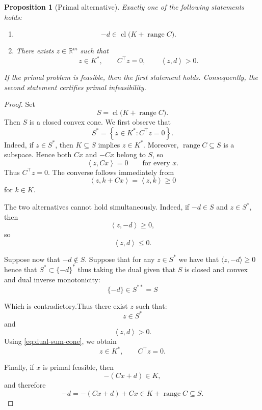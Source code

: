 \documentclass[a4paper,11pt]{book}
\theoremstyle{plain}
\newtheorem{proposition}[theorem]{Proposition}
\theoremstyle{definition}
\theoremstyle{remark}
\numberwithin{equation}{chapter}
\numberwithin{algorithm}{chapter}
\newcommand{\R}{\mathbb{R}}
\newcommand{\inner}[2]{\left\langle #1, #2 \right\rangle}
\newcommand{\range}{\operatorname{range}}
\begin{document}
	\begin{proposition}[Primal alternative]
		Exactly one of the following statements holds:
		
		\begin{enumerate}
			\item
			\[
			-d\in\operatorname{cl}\bigl(K+\range C\bigr).
			\]
			
			\item There exists \(z\in\R^m\) such that
			\[
			z\in K^*,
			\qquad
			C^\top z=0,
			\qquad
			\inner{z}{d}>0.
			\]
		\end{enumerate}
		
		If the primal problem is feasible, then the first statement holds.
		Consequently, the second statement certifies primal infeasibility.
	\end{proposition}
	
	\begin{proof}
		Set
		\[
		S=\operatorname{cl}\bigl(K+\range C\bigr).
		\]
		Then \(S\) is a closed convex cone. We first observe that
		\begin{equation}
			S^*
			=
			\left\{
			z\in K^*:C^\top z=0
			\right\}.
			\label{eq:dual-sum-cone}
		\end{equation}
		Indeed, if \(z\in S^*\), then \(K\subseteq S\) implies \(z\in K^*\).
		Moreover, \(\range C\subseteq S\) is a subspace. Hence both \(Cx\) and
		\(-Cx\) belong to \(S\), so
		\[
		\inner{z}{Cx}=0
		\qquad
		\text{for every }x.
		\]
		Thus \(C^\top z=0\). The converse follows immediately from
		\[
		\inner{z}{k+Cx}
		=
		\inner{z}{k}
		\geq0
		\]
		for \(k\in K\).
		
		The two alternatives cannot hold simultaneously. Indeed, if
		\(-d\in S\) and \(z\in S^*\), then
		\[
		\inner{z}{-d}\geq0,
		\]
		so
		\[
		\inner{z}{d}\leq0.
		\]
		
		Suppose now that \(-d\notin S\). Suppose that for any $z\in S^*$ we have that $\langle z,-d\rangle \geq 0$ hence that $S^* \subset  \{-d\}^*$ thus taking the dual given that $S$ is closed and convex and dual inverse monotonicity:
		$$ \{-d\} \in S^{**} =  S  $$
		
		Which is contradictory.Thus there exist $z$ such that:
		\[
		z\in S^*
		\]
		and
		\[
		\inner{z}{d}>0.
		\]
		Using \eqref{eq:dual-sum-cone}, we obtain
		\[
		z\in K^*,
		\qquad
		C^\top z=0.
		\]
		
		Finally, if \(x\) is primal feasible, then
		\[
		-(Cx+d)\in K,
		\]
		and therefore
		\[
		-d
		=
		-(Cx+d)+Cx
		\in
		K+\range C
		\subseteq S.
		\]
	\end{proof}
	
\end{document}
